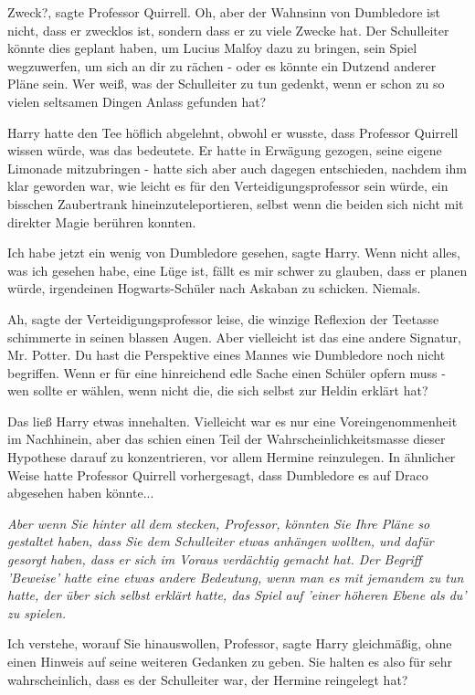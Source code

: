 \glqq Zweck?\grqq{}, sagte Professor Quirrell. \glqq Oh, aber der Wahnsinn von
Dumbledore ist nicht, dass er zwecklos ist, sondern dass er zu viele Zwecke hat.
Der Schulleiter könnte dies geplant haben, um Lucius Malfoy dazu zu bringen,
sein Spiel wegzuwerfen, um sich an dir zu rächen - oder es könnte ein Dutzend
anderer Pläne sein. Wer weiß, was der Schulleiter zu tun gedenkt, wenn er schon
zu so vielen seltsamen Dingen Anlass gefunden hat?\grqq{}

Harry hatte den Tee höflich abgelehnt, obwohl er wusste, dass Professor Quirrell
wissen würde, was das bedeutete. Er hatte in Erwägung gezogen, seine eigene
Limonade mitzubringen - hatte sich aber auch dagegen entschieden, nachdem ihm
klar geworden war, wie leicht es für den Verteidigungsprofessor sein würde, ein
bisschen Zaubertrank hineinzuteleportieren, selbst wenn die beiden sich nicht
mit direkter Magie berühren konnten.

\glqq Ich habe jetzt ein wenig von Dumbledore gesehen\grqq{}, sagte Harry. \glqq
Wenn nicht alles, was ich gesehen habe, eine Lüge ist, fällt es mir schwer zu
glauben, dass er planen würde, irgendeinen Hogwarts-Schüler nach Askaban zu
schicken. Niemals.\grqq{}

\glqq Ah\grqq{}, sagte der Verteidigungsprofessor leise, die winzige Reflexion
der Teetasse schimmerte in seinen blassen Augen. \glqq Aber vielleicht ist das
eine andere Signatur, Mr. Potter. Du hast die Perspektive eines Mannes wie
Dumbledore noch nicht begriffen. Wenn er für eine hinreichend edle Sache einen
Schüler opfern muss - wen sollte er wählen, wenn nicht die, die sich selbst zur
Heldin erklärt hat?\grqq{}

Das ließ Harry etwas innehalten. Vielleicht war es nur eine Voreingenommenheit
im Nachhinein, aber das schien einen Teil der Wahrscheinlichkeitsmasse dieser
Hypothese darauf zu konzentrieren, vor allem Hermine reinzulegen. In ähnlicher
Weise hatte Professor Quirrell vorhergesagt, dass Dumbledore es auf Draco
abgesehen haben könnte...

\emph{Aber wenn Sie hinter all dem stecken, Professor, könnten Sie Ihre Pläne so gestaltet haben, dass Sie dem Schulleiter etwas anhängen wollten, und dafür gesorgt haben, dass er sich im Voraus verdächtig gemacht hat. Der Begriff 'Beweise' hatte eine etwas andere Bedeutung, wenn man es mit jemandem zu tun hatte, der über sich selbst erklärt hatte, das Spiel auf 'einer höheren Ebene als du' zu spielen.}

\glqq Ich verstehe, worauf Sie hinauswollen, Professor\grqq{}, sagte Harry
gleichmäßig, ohne einen Hinweis auf seine weiteren Gedanken zu geben. \glqq Sie
halten es also für sehr wahrscheinlich, dass es der Schulleiter war, der Hermine
reingelegt hat?\grqq{}


